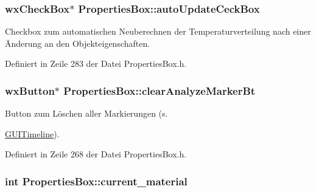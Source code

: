 \hypertarget{classPropertiesBox_aea93bc13aea5197dfe5d53f6c465c0ad}{
\subsubsection[{auto\-Update\-Ceck\-Box}]{\setlength{\rightskip}{0pt plus 5cm}wx\-Check\-Box$\ast$ Properties\-Box\-::auto\-Update\-Ceck\-Box\hspace{0.3cm}{\ttfamily [private]}}}\label{classPropertiesBox_aea93bc13aea5197dfe5d53f6c465c0ad}


Checkbox zum automatischen Neuberechnen der Temperaturverteilung nach einer Änderung an den Objekteigenschaften. 



Definiert in Zeile 283 der Datei Properties\-Box.\-h.

\hypertarget{classPropertiesBox_a93a88ce0e08aee33673b26ae63c7846f}{
\subsubsection[{clear\-Analyze\-Marker\-Bt}]{\setlength{\rightskip}{0pt plus 5cm}wx\-Button$\ast$ Properties\-Box\-::clear\-Analyze\-Marker\-Bt\hspace{0.3cm}{\ttfamily [private]}}}\label{classPropertiesBox_a93a88ce0e08aee33673b26ae63c7846f}


Button zum Löschen aller Markierungen (s. 

\hyperlink{classGUITimeline}{G\-U\-I\-Timeline}). 

Definiert in Zeile 268 der Datei Properties\-Box.\-h.

\hypertarget{classPropertiesBox_a83244ddd61bfd31452a3a975b107becb}{
\subsubsection[{current\-\_\-material}]{\setlength{\rightskip}{0pt plus 5cm}int Properties\-Box\-::current\-\_\-material\hspace{0.3cm}{\ttfamily [private]}}}\label{classPropertiesBox_a83244ddd61bfd31452a3a975b107becb}


